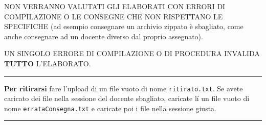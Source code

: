 \documentclass[a4paper]{article}
\begin{document}
NON VERRANNO VALUTATI GLI ELABORATI CON ERRORI DI COMPILAZIONE O 
LE CONSEGNE CHE NON RISPETTANO LE SPECIFICHE (ad esempio consegnare un 
archivio zippato è sbagliato, come anche consegnare ad un docente diverso dal 
proprio assegnato).

UN SINGOLO ERRORE DI COMPILAZIONE O DI PROCEDURA INVALIDA 
\textbf{TUTTO} 
L'ELABORATO.

\medskip


\hrule
\medskip
{\bf Per ritirarsi}
fare l'upload di un file vuoto di nome  \texttt{ritirato.txt}. Se avete caricato dei file nella sessione del docente sbagliato, caricate l\'i un file vuoto di nome  \texttt{errataConsegna.txt} e caricate poi i file nella sessione giusta.  

\hrule


\end{document}
